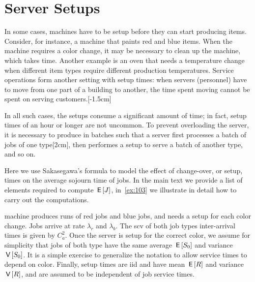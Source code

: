 \documentclass[stochastic-or.tex]{subfiles}
\begin{document}
\section{Server Setups}
\label{sec:setups-batch-proc}

In some cases, machines have to be setup before they can start producing items.
Consider, for instance, a machine that paints red and blue items.
When the machine requires a color change, it may be necessary to clean up the machine, which takes time.
Another example is an oven that needs a temperature change when different item types require different production temperatures.
Service operations form another setting with setup times: when servers (personnel) have to move from one part of a building to another, the time spent moving cannot be spent on serving customers.[-1.5cm]


In all such cases, the setups consume a significant amount of time; in fact, setup times of an hour or longer are not uncommon.
To prevent overloading the server, it is necessary to produce in batches such that a server first processes a batch of jobs of one type[2cm], then performes a setup to serve a batch of another type, and so on.

Here we use Sakasegawa's formula to model the effect of change-over, or setup, times on the average sojourn time of jobs.
In the main text we provide a list of elements required to compute $\,\mathsf{E}\left[J\right]$, in~\cref{ex:103} we illustrate in detail how to carry out the computations.

 machine produces runs of red jobs and blue jobs, and needs a setup for each color change.
Jobs arrive at rate $\lambda_r$ and $\lambda_b$.
The scv of both job types inter-arrival times is given by $C_a^2$.
Once the server is setup for the correct color, we assume for simplicity that jobs of both type have the same average  $\,\mathsf{E}\left[S_0\right]$ and variance $\,\mathsf{V}\left[S_0\right]$.
It is a simple exercise to generalize the notation to allow service times to depend on color.
Finally, setup times are iid and have mean $\,\mathsf{E}\left[R\right]$ and variance $\,\mathsf{V}\left[R\right]$, and are assumed to be independent of job service times.
\end{document}
